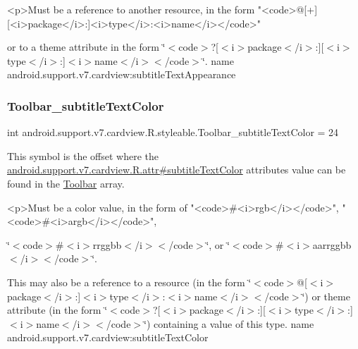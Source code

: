 \begin{DoxyVerb}      <p>Must be a reference to another resource, in the form "<code>@[+][<i>package</i>:]<i>type</i>:<i>name</i></code>"
\end{DoxyVerb}
 or to a theme attribute in the form \char`\"{}$<$code$>$?\mbox{[}$<$i$>$package$<$/i$>$\+:\mbox{]}\mbox{[}$<$i$>$type$<$/i$>$\+:\mbox{]}$<$i$>$name$<$/i$>$$<$/code$>$\char`\"{}.  name android.\+support.\+v7.\+cardview\+:subtitle\+Text\+Appearance \mbox{\label{classandroid_1_1support_1_1v7_1_1cardview_1_1R_1_1styleable_a666ac2e125d2da2c2f5914e8752d53c5}} 
\subsubsection{\texorpdfstring{Toolbar\+\_\+subtitle\+Text\+Color}{Toolbar\_subtitleTextColor}}
{\footnotesize\ttfamily int android.\+support.\+v7.\+cardview.\+R.\+styleable.\+Toolbar\+\_\+subtitle\+Text\+Color = 24\hspace{0.3cm}{\ttfamily [static]}}

This symbol is the offset where the \hyperlink{classandroid_1_1support_1_1v7_1_1cardview_1_1R_1_1attr_a109d4dfb508eff6f5090aca6109b6ddb}{android.\+support.\+v7.\+cardview.\+R.\+attr\#subtitle\+Text\+Color} attribute\textquotesingle{}s value can be found in the \hyperlink{classandroid_1_1support_1_1v7_1_1cardview_1_1R_1_1styleable_a26149aeb8fd339abe09ecc9d92b9304f}{Toolbar} array.

\begin{DoxyVerb}      <p>Must be a color value, in the form of "<code>#<i>rgb</i></code>", "<code>#<i>argb</i></code>",
\end{DoxyVerb}
 \char`\"{}$<$code$>$\#$<$i$>$rrggbb$<$/i$>$$<$/code$>$\char`\"{}, or \char`\"{}$<$code$>$\#$<$i$>$aarrggbb$<$/i$>$$<$/code$>$\char`\"{}. 

This may also be a reference to a resource (in the form \char`\"{}$<$code$>$@\mbox{[}$<$i$>$package$<$/i$>$\+:\mbox{]}$<$i$>$type$<$/i$>$\+:$<$i$>$name$<$/i$>$$<$/code$>$\char`\"{}) or theme attribute (in the form \char`\"{}$<$code$>$?\mbox{[}$<$i$>$package$<$/i$>$\+:\mbox{]}\mbox{[}$<$i$>$type$<$/i$>$\+:\mbox{]}$<$i$>$name$<$/i$>$$<$/code$>$\char`\"{}) containing a value of this type.  name android.\+support.\+v7.\+cardview\+:subtitle\+Text\+Color \mbox{\label{classandroid_1_1support_1_1v7_1_1cardview_1_1R_1_1styleable_a8a1e899ea860ef6abef71ec802396325}} 
